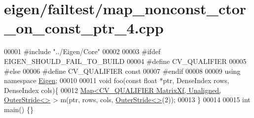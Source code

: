 \hypertarget{eigen_2failtest_2map__nonconst__ctor__on__const__ptr__4_8cpp_source}{}\section{eigen/failtest/map\+\_\+nonconst\+\_\+ctor\+\_\+on\+\_\+const\+\_\+ptr\+\_\+4.cpp}
\label{eigen_2failtest_2map__nonconst__ctor__on__const__ptr__4_8cpp_source}

\begin{DoxyCode}
00001 \textcolor{preprocessor}{#include "../Eigen/Core"}
00002 
00003 \textcolor{preprocessor}{#ifdef EIGEN\_SHOULD\_FAIL\_TO\_BUILD}
00004 \textcolor{preprocessor}{#define CV\_QUALIFIER}
00005 \textcolor{preprocessor}{#else}
00006 \textcolor{preprocessor}{#define CV\_QUALIFIER const}
00007 \textcolor{preprocessor}{#endif}
00008 
00009 \textcolor{keyword}{using namespace }\hyperlink{namespace_eigen}{Eigen};
00010 
00011 \textcolor{keywordtype}{void} foo(\textcolor{keyword}{const} \textcolor{keywordtype}{float} *ptr, DenseIndex rows, DenseIndex cols)\{
00012     \hyperlink{group___core___module_class_eigen_1_1_map}{Map<CV\_QUALIFIER MatrixXf, Unaligned, OuterStride<>} 
      > m(ptr, rows, cols, \hyperlink{class_eigen_1_1_outer_stride}{OuterStride<>}(2));
00013 \}
00014 
00015 \textcolor{keywordtype}{int} main() \{\}
\end{DoxyCode}
